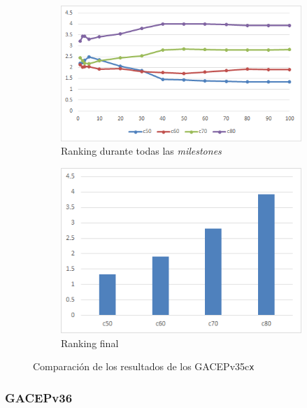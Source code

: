 \begin{figure}[h]
     \centering
     \begin{subfigure}[b]{0.45\textwidth}
         \centering
         \includegraphics[width=\textwidth]{imagenes/Experimental/GACEPv35.png}
         \caption{Ranking durante todas las \textit{milestones}}
         \label{fig:GACEPv35_lineas}
     \end{subfigure}
     \hfill
     \begin{subfigure}[b]{0.45\textwidth}
         \centering
         \includegraphics[width=\textwidth]{imagenes/Experimental/barras/GACEPv35.png}
         \caption{Ranking final}
         \label{fig:GACEPv35_barras}
     \end{subfigure}
        \caption{Comparación de los resultados de los GACEPv35c\texttt{x}}
        \label{fig:GACEPv35}
\end{figure}

\subsubsection{GACEPv36}

